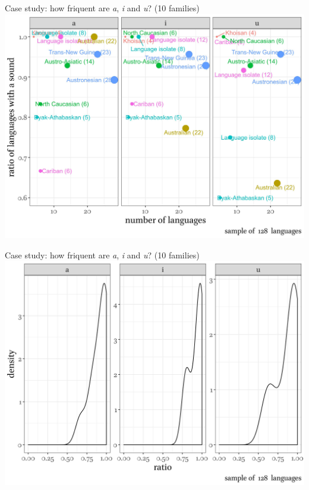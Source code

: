 \documentclass[13pt, t]{beamer}
\begin{document}
\begin{frame}{Case study: how friquent are \textit{a}, \textit{i} and \textit{u}? (10 families)}
\includegraphics[width = \linewidth]{images/06_families_sample}
\end{frame}

\begin{frame}{Case study: how friquent are \textit{a}, \textit{i} and \textit{u}? (10 families)}
\includegraphics[width = \linewidth]{images/07_distributions}
\end{frame}
\end{document}
